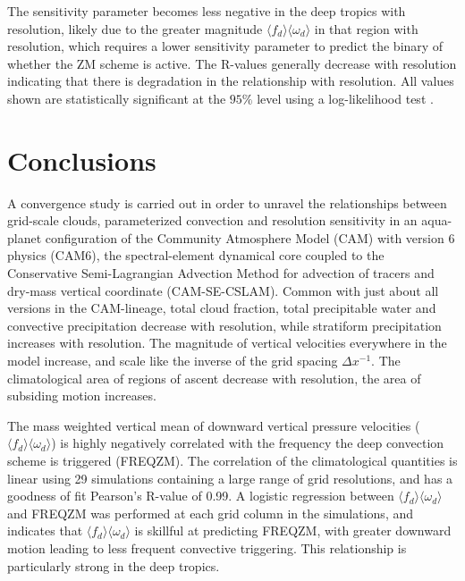 The sensitivity parameter becomes less negative in the deep tropics with resolution, likely due to the greater magnitude $\langle f_{d} \rangle \langle \omega_{d} \rangle$ in that region with resolution, which requires a lower sensitivity parameter to predict the binary of whether the ZM scheme is active. The R-values generally decrease with resolution indicating that there is degradation in the relationship with resolution. All values shown are statistically significant at the $95\%$ level using a log-likelihood test \citep{WILKSBOOK}.
 
\section{Conclusions}

A convergence study is carried out in order to unravel the relationships between grid-scale clouds, parameterized convection and resolution sensitivity in an aqua-planet configuration of the Community Atmosphere Model (CAM) with version 6 physics (CAM6), the spectral-element dynamical core coupled to the Conservative Semi-Lagrangian Advection Method for advection of tracers and dry-mass vertical coordinate (CAM-SE-CSLAM). Common with just about all versions in the CAM-lineage, total cloud fraction, total precipitable water and convective precipitation decrease with resolution, while stratiform precipitation increases with resolution. The magnitude of vertical velocities everywhere in the model increase, and scale like the inverse of the grid spacing $\Delta x^{-1}$. The climatological area of regions of ascent decrease with resolution, the area of subsiding motion increases.

 The mass weighted vertical mean of downward vertical pressure velocities ($\langle f_{d} \rangle \langle \omega_{d} \rangle$) is highly negatively correlated with the frequency the \cite{ZM1995AO} deep convection scheme is triggered (FREQZM). The correlation of the climatological quantities is linear using 29 simulations containing a large range of grid resolutions, and has a goodness of fit Pearson's R-value of 0.99. A logistic regression between $\langle f_{d} \rangle \langle \omega_{d} \rangle$ and FREQZM was performed at each grid column in the simulations, and indicates that $\langle f_{d} \rangle \langle \omega_{d} \rangle$ is skillful at predicting FREQZM, with greater downward motion leading to less frequent convective triggering. This relationship is particularly strong in the deep tropics.
 
